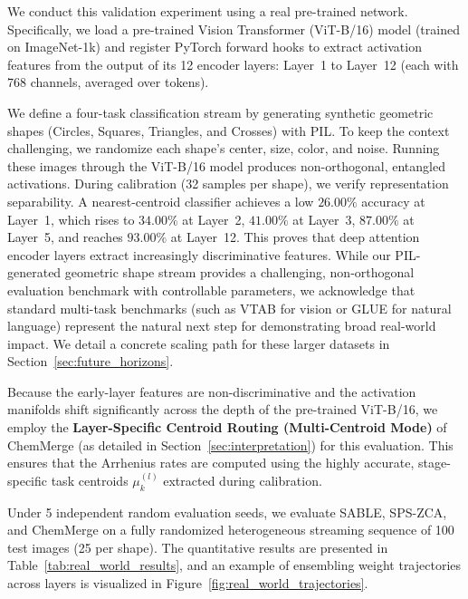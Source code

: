 We conduct this validation experiment using a real pre-trained network. Specifically, we load a pre-trained Vision Transformer (ViT-B/16) model (trained on ImageNet-1k) and register PyTorch forward hooks to extract activation features from the output of its 12 encoder layers: Layer~1 to Layer~12 (each with 768 channels, averaged over tokens). 

We define a four-task classification stream by generating synthetic geometric shapes (Circles, Squares, Triangles, and Crosses) with PIL. To keep the context challenging, we randomize each shape's center, size, color, and noise. Running these images through the ViT-B/16 model produces non-orthogonal, entangled activations. During calibration (32 samples per shape), we verify representation separability. A nearest-centroid classifier achieves a low $26.00\%$ accuracy at Layer~1, which rises to $34.00\%$ at Layer~2, $41.00\%$ at Layer~3, $87.00\%$ at Layer~5, and reaches $93.00\%$ at Layer~12. This proves that deep attention encoder layers extract increasingly discriminative features. While our PIL-generated geometric shape stream provides a challenging, non-orthogonal evaluation benchmark with controllable parameters, we acknowledge that standard multi-task benchmarks (such as VTAB for vision or GLUE for natural language) represent the natural next step for demonstrating broad real-world impact. We detail a concrete scaling path for these larger datasets in Section~\ref{sec:future_horizons}.

Because the early-layer features are non-discriminative and the activation manifolds shift significantly across the depth of the pre-trained ViT-B/16, we employ the \textbf{Layer-Specific Centroid Routing (Multi-Centroid Mode)} of ChemMerge (as detailed in Section~\ref{sec:interpretation}) for this evaluation. This ensures that the Arrhenius rates are computed using the highly accurate, stage-specific task centroids $\mu_k^{(l)}$ extracted during calibration. 

Under 5 independent random evaluation seeds, we evaluate SABLE, SPS-ZCA, and ChemMerge on a fully randomized heterogeneous streaming sequence of 100 test images (25 per shape). The quantitative results are presented in Table~\ref{tab:real_world_results}, and an example of ensembling weight trajectories across layers is visualized in Figure~\ref{fig:real_world_trajectories}.

